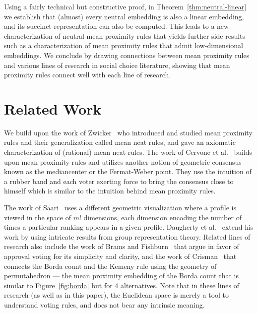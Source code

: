 \documentclass[prodmode]{acmsmall-ec14}
\begin{document}
Using a fairly technical but constructive proof, in Theorem~\ref{thm:neutral-linear} we establish that (almost) every neutral embedding is also a linear embedding, and its succinct representation can also be computed. This leads to a new characterization of neutral mean proximity rules that yields further side results such as a characterization of mean proximity rules that admit low-dimensional embeddings. We conclude by drawing connections between mean proximity rules and various lines of research in social choice literature, showing that mean proximity rules connect well with each line of research. 

\section{Related Work}
\label{sec:related}

We build upon the work of Zwicker~ who introduced and studied mean proximity rules and their generalization called mean neat rules, and gave an axiomatic characterization of (rational) mean neat rules. The work of Cervone et al.~ builds upon mean proximity rules and utilizes another notion of geometric consensus known as the mediancenter or the Fermat-Weber point. They use the intuition of a rubber band and each voter exerting force to bring the consensus close to himself which is similar to the intuition behind mean proximity rules. 

The work of Saari~ uses a different geometric visualization where a profile is viewed in the space of $m!$ dimensions, each dimension encoding the number of times a particular ranking appears in a given profile. Daugherty et al.~ extend his work by using intricate results from group representation theory. Related lines of research also include the work of Brams and Fishburn~ that argue in favor of approval voting for its simplicity and clarity, and the work of Crisman~ that connects the Borda count and the Kemeny rule using the geometry of permutahedron --- the mean proximity embedding of the Borda count that is similar to Figure~\ref{fig:borda} but for $4$ alternatives. Note that in these lines of research (as well as in this paper), the Euclidean space is merely a tool to understand voting rules, and does not bear any intrinsic meaning.

\end{document}
